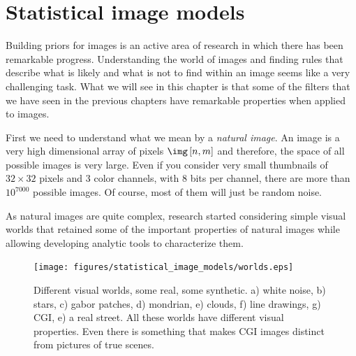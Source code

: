 \chapter{Statistical image models}


Building priors for images is an active area of research in which there has been remarkable progress. Understanding the world of images and finding rules that describe what is likely and what is not to find within an image seems like a very challenging task. What we will see in this chapter is that some of the filters that we have seen in the previous chapters have remarkable properties when applied to images.

First we need to understand what we mean by a {\em natural image}. An image is a very high dimensional array of pixels $\img \left[n,m\right]$ and therefore, the space of all possible images is very large. Even if you consider very small thumbnails of $32\times32$ pixels and 3 color channels, with 8 bits per channel, there are more than $10^{7000}$ possible images. Of course, most of them will just be random noise. 

As natural images are quite complex, research started considering simple visual worlds that retained some of the important properties of natural images while allowing developing analytic tools to characterize them.


\begin{figure}[htpb]
\centerline{
\texttt{[image: figures/statistical\_image\_models/worlds.eps]}
} 
\caption{Different visual worlds, some real, some synthetic. a) white noise, b) stars, c) gabor patches, d) mondrian, e) clouds, f) line drawings, g) CGI, e) a real street. All these worlds have different visual properties. Even there is something that makes CGI images distinct from pictures of true scenes.} 
\label{fig:worlds}
\end{figure}


